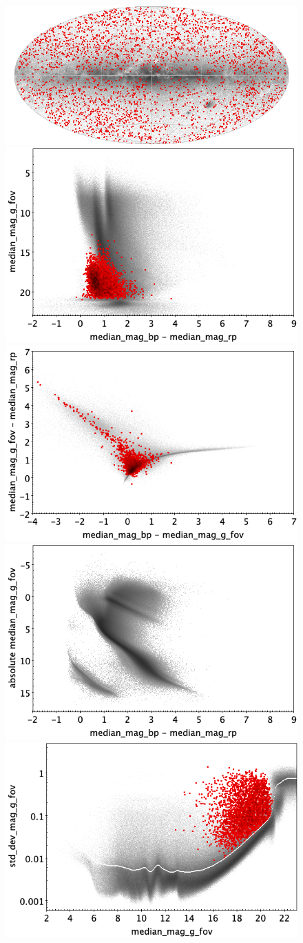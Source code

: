 \documentclass[longauth]{aa}
\begin{document}
\begin{appendix}
\begin{figure}
\centering
{} \includegraphics[width=0.6\hsize]{figures/appendix/AGN_trn_sky.png} \\ %
\vspace{4mm}
 \includegraphics[width=0.45\hsize]{figures/appendix/AGN_trn_cm.png}  %
\hspace{2mm}
 \includegraphics[width=0.45\hsize]{figures/appendix/AGN_trn_cc.png} \\ %
\vspace{4mm}
 \includegraphics[width=0.45\hsize]{figures/appendix/AGN_trn_cam.png}  %
\hspace{2mm}
 \includegraphics[width=0.45\hsize]{figures/appendix/AGN_trn_msd.png} \\ %

\end{figure}
\end{appendix}
\end{document}
